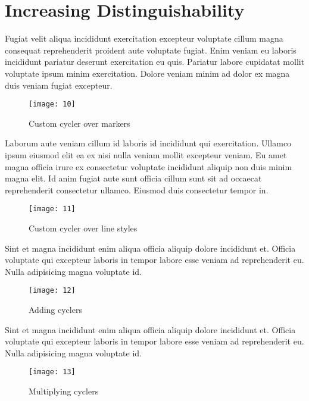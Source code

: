 \section{Increasing Distinguishability}
\label{sec:distinguishability}
Fugiat velit aliqua incididunt exercitation excepteur voluptate cillum magna consequat reprehenderit proident aute voluptate fugiat. Enim veniam eu laboris incididunt pariatur deserunt exercitation eu quis. Pariatur labore cupidatat mollit voluptate ipsum minim exercitation. Dolore veniam minim ad dolor ex magna duis veniam fugiat excepteur.

\begin{figure}[!h]
    \centering
    \texttt{[image: 10]}
    \caption{Custom cycler over markers}
    \label{fig:custom_markers}
\end{figure}

Laborum aute veniam cillum id laboris id incididunt qui exercitation. Ullamco ipsum eiusmod elit ea ex nisi nulla veniam mollit excepteur veniam. Eu amet magna officia irure ex consectetur voluptate incididunt aliquip non duis minim magna elit. Id anim fugiat aute sunt officia cillum sunt sit ad occaecat reprehenderit consectetur ullamco. Eiusmod duis consectetur tempor in.

\begin{figure}[!h]
    \centering
    \texttt{[image: 11]}
    \caption{Custom cycler over line styles}
    \label{fig:custom_ls}
\end{figure}

Sint et magna incididunt enim aliqua officia aliquip dolore incididunt et. Officia voluptate qui excepteur laboris in tempor labore esse veniam ad reprehenderit eu. Nulla adipisicing magna voluptate id.

\begin{figure}[!h]
    \centering
    \texttt{[image: 12]}
    \caption{Adding cyclers}
    \label{fig:adding_cyclers}
\end{figure}

Sint et magna incididunt enim aliqua officia aliquip dolore incididunt et. Officia voluptate qui excepteur laboris in tempor labore esse veniam ad reprehenderit eu. Nulla adipisicing magna voluptate id.

\begin{figure}[!h]
    \centering
    \texttt{[image: 13]}
    \caption{Multiplying cyclers}
    \label{fig:multiplying_cyclers}
\end{figure}

